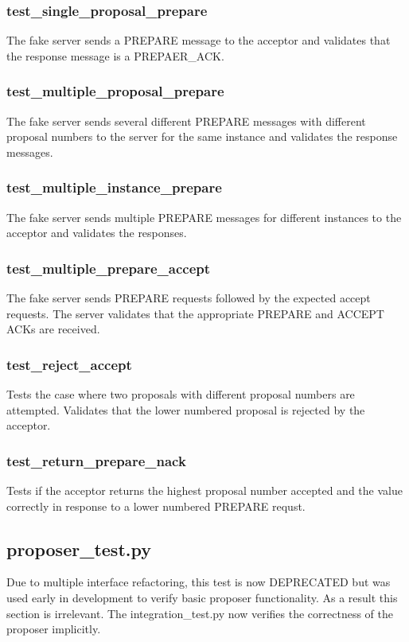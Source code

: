 \documentclass{article}
\begin{document}
\subsubsection{test\_single\_proposal\_prepare}
The fake server sends a PREPARE message to the acceptor and validates that the response message is a PREPAER\_ACK.

\subsubsection{test\_multiple\_proposal\_prepare}
The fake server sends several different PREPARE messages with different proposal numbers to the server for the same instance and validates the response messages.

\subsubsection{test\_multiple\_instance\_prepare}
The fake server sends multiple PREPARE messages for different instances to the acceptor and validates the responses.

\subsubsection{test\_multiple\_prepare\_accept}
The fake server sends PREPARE requests followed by the expected accept requests.
The server validates that the appropriate PREPARE and ACCEPT ACKs are received.

\subsubsection{test\_reject\_accept}
Tests the case where two proposals with different proposal numbers are attempted.
Validates that the lower numbered proposal is rejected by the acceptor.

\subsubsection{test\_return\_prepare\_nack}
Tests if the acceptor returns the highest proposal number accepted and the value correctly in response to a lower numbered PREPARE requst.

\subsection{proposer\_test.py}

Due to multiple interface refactoring, this test is now DEPRECATED but was used early in development to verify basic proposer functionality. As a result this section is irrelevant.
The integration\_test.py now verifies the correctness of the proposer implicitly.
\end{document}
